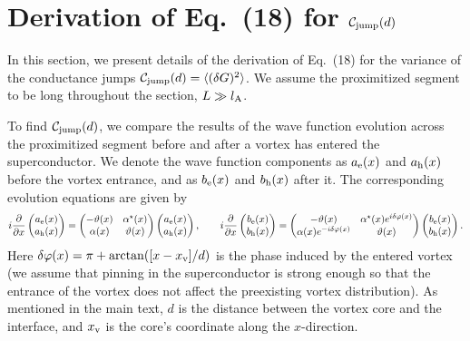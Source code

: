 \documentclass[pra,aps,a4paper,twocolumn,superscriptaddress,longbibliography]{revtex4-2}
\newcommand{\lprox}{L}
\newcommand{\lA}{l_{\rm A}}
\begin{document}
\section{Derivation of Eq.~(18) for ${\cal C}_{\rm jump}(d)$}

In this section, we present details of the derivation of Eq.~(18) for the variance of the conductance jumps ${\cal C}_{\rm jump}(d) = \langle (\delta G)^2 \rangle$. We assume the proximitized segment to be long throughout the section, $\lprox \gg \lA$.


To find ${\cal C}_{\rm jump}(d)$, we compare the results of the wave function evolution across the proximitized segment before and after a vortex has entered the superconductor.
We denote the wave function components as $a_{\rm e}(x)$ and $a_{\rm h}(x)$ before the vortex entrance, and as $b_{\rm e}(x)$ and $b_{\rm h}(x)$ after it. The corresponding evolution equations are given by
\begin{equation}\label{eq:evol_v}
    i \frac{\partial}{\partial x}
    \begin{pmatrix}
    a_{\rm e}(x)\\
    a_{\rm h}(x)
    \end{pmatrix}
    = 
    \begin{pmatrix}
    -\vartheta(x) & \alpha^\star(x)\\
    \alpha(x) & \vartheta(x)
    \end{pmatrix}
    \begin{pmatrix}
    a_{\rm e}(x)\\
    a_{\rm h}(x)
    \end{pmatrix}, \quad \quad
    i \frac{\partial}{\partial x}\begin{pmatrix}
    b_{\rm e}(x)\\
    b_{\rm h}(x)
    \end{pmatrix} = 
    \begin{pmatrix}
    -\vartheta(x) & \alpha^\star(x) e^{i\delta \varphi(x)}\\
    \alpha(x)e^{-i\delta\varphi(x)} & \vartheta(x)
    \end{pmatrix} 
    \begin{pmatrix}
    b_{\rm e}(x)\\
    b_{\rm h}(x)
    \end{pmatrix}.
\end{equation}
Here $\delta \varphi(x) = \pi + \arctan ([x - x_{\rm v}] / d)$ is the phase induced by the entered vortex (we assume that pinning in the superconductor is strong enough so that the entrance of the vortex does not affect the preexisting vortex distribution). As mentioned in the main text, $d$ is the distance between the vortex core and the interface, and $x_{\rm v}$ is the core's coordinate along the $x$-direction.
\end{document}
